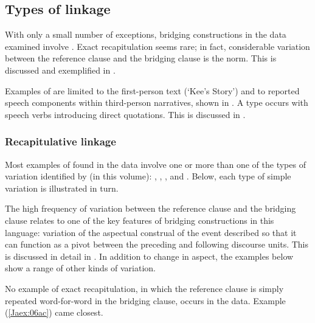 \documentclass[output=paper]{LSP/langsci}
\begin{document}
\subsection{Types of linkage}
\label{Jatypes}
With only a small number of exceptions, bridging constructions in the  data examined involve . Exact recapitulation seems rare; in fact, considerable variation between the reference clause and the bridging clause is the norm. This is discussed and exemplified in . 
 
Examples of  are limited to the first-person text (`Kee’s Story') and to reported speech components within third-person narratives, shown in . A  type occurs with speech verbs introducing direct quotations. This is discussed in .
 
\subsubsection{Recapitulative linkage}
\label{JaRecapitulative}
Most examples of  found in the data involve one or more than one of the types of variation identified by \citeauthor{guerin18} (in this volume): , , , and . Below, each type of simple variation is illustrated in turn.
 
The high frequency of variation between the reference clause and the bridging clause relates to one of the key features of bridging constructions in this language: variation of the aspectual construal of the event described so that it can function as a pivot between the preceding and following discourse units. This is discussed in detail in . In addition to change in aspect, the examples below show a range of other kinds of variation.
 

No example of exact recapitulation, in which the reference clause is simply repeated word-for-word in the bridging clause, occurs in the data. Example (\ref{Jaex:06ac}) came closest.
\end{document}

